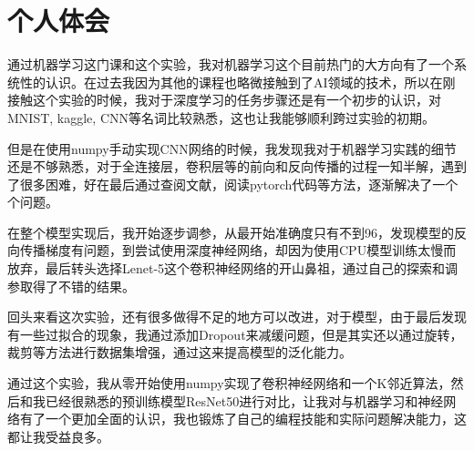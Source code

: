 
\section{个人体会}

通过机器学习这门课和这个实验，我对机器学习这个目前热门的大方向有了一个系统性的认识。在过去我因为其他的课程也略微接触到了AI领域的技术，所以在刚接触这个实验的时候，我对于深度学习的任务步骤还是有一个初步的认识，对MNIST, kaggle, CNN等名词比较熟悉，这也让我能够顺利跨过实验的初期。

但是在使用numpy手动实现CNN网络的时候，我发现我对于机器学习实践的细节还是不够熟悉，对于全连接层，卷积层等的前向和反向传播的过程一知半解，遇到了很多困难，好在最后通过查阅文献，阅读pytorch代码等方法，逐渐解决了一个个问题。

在整个模型实现后，我开始逐步调参，从最开始准确度只有不到96，发现模型的反向传播梯度有问题，到尝试使用深度神经网络，却因为使用CPU模型训练太慢而放弃，最后转头选择Lenet-5这个卷积神经网络的开山鼻祖，通过自己的探索和调参取得了不错的结果。

回头来看这次实验，还有很多做得不足的地方可以改进，对于模型，由于最后发现有一些过拟合的现象，我通过添加Dropout来减缓问题，但是其实还以通过旋转，裁剪等方法进行数据集增强，通过这来提高模型的泛化能力。

通过这个实验，我从零开始使用numpy实现了卷积神经网络和一个K邻近算法，然后和我已经很熟悉的预训练模型ResNet50进行对比，让我对与机器学习和神经网络有了一个更加全面的认识，我也锻炼了自己的编程技能和实际问题解决能力，这都让我受益良多。
